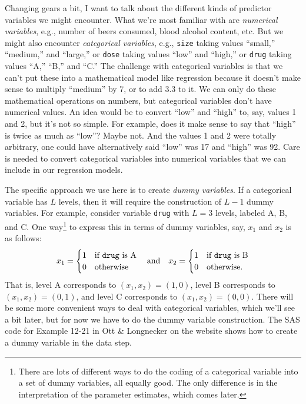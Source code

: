 \documentclass[a4paper, 12pt]{article}
\theoremstyle{plain}
\theoremstyle{definition}
\theoremstyle{remark}
\begin{document}
Changing gears a bit, I want to talk about the different kinds of predictor variables we might encounter.  What we're most familiar with are {\em numerical variables}, e.g., number of beers consumed, blood alcohol content, etc.  But we might also encounter {\em categorical variables}, e.g., {\tt size} taking values ``small,'' ``medium,'' and ``large,'' or {\tt dose} taking values ``low'' and ``high,'' or {\tt drug} taking values ``A,'' ``B,'' and ``C.''  The challenge with categorical variables is that we can't put these into a mathematical model like regression because it doesn't make sense to multiply ``medium'' by 7, or to add 3.3 to it.  We can only do these mathematical operations on numbers, but categorical variables don't have numerical values.  An idea would be to convert ``low'' and ``high'' to, say, values 1 and 2, but it's not so simple.  For example, does it make sense to say that ``high'' is twice as much as ``low''?  Maybe not.  And the values 1 and 2 were totally arbitrary, one could have alternatively said ``low'' was 17 and ``high'' was 92.  Care is needed to convert categorical variables into numerical variables that we can include in our regression models.  

The specific approach we use here is to create {\em dummy variables}.  If a categorical variable has $L$ levels, then it will require the construction of $L-1$ dummy variables.  For example, consider variable {\tt drug} with $L=3$ levels, labeled A, B, and C.  One way\footnote{There are lots of different ways to do the coding of a categorical variable into a set of dummy variables, all equally good.  The only difference is in the interpretation of the parameter estimates, which comes later.} to express this in terms of dummy variables, say, $x_1$ and $x_2$ is as follows:
\[ x_1 = \begin{cases} 1 & \text{if {\tt drug} is A} \\ 0 & \text{otherwise} \end{cases} \quad \text{and} \quad x_2 = \begin{cases} 1 & \text{if {\tt drug} is B} \\ 0 & \text{otherwise}. \end{cases} \]
That is, level A corresponds to $(x_1,x_2) = (1,0)$, level B corresponds to $(x_1,x_2)=(0,1)$, and level C corresponds to $(x_1,x_2) = (0,0)$.  There will be some more convenient ways to deal with categorical variables, which we'll see a bit later, but for now we have to do the dummy variable construction.  The SAS code for Example 12-21 in Ott \& Longnecker on the website shows how to create a dummy variable in the data step.  
\end{document}
